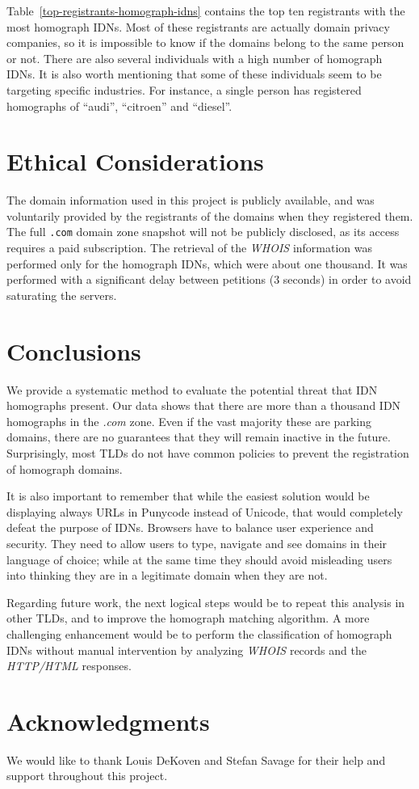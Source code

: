 \documentclass[letterpaper,twocolumn,10pt]{article}
\begin{document}
Table~\ref{top-registrants-homograph-idns} contains the top ten registrants with the most homograph IDNs.
Most of these registrants are actually domain privacy companies, so it is impossible to know if the domains belong to the same person or not.
There are also several individuals with a high number of homograph IDNs.
It is also worth mentioning that some of these individuals seem to be targeting specific industries.
For instance, a single person has registered homographs of ``audi'', ``citroen'' and ``diesel''.

\section{Ethical Considerations}
The domain information used in this project is publicly available, and was voluntarily provided by the registrants of the domains when they registered them.
The full \texttt{.com} domain zone snapshot will not be publicly disclosed, as its access requires a paid subscription.
The retrieval of the \textit{WHOIS} information was performed only for the homograph IDNs, which were about one thousand.
It was performed with a significant delay between petitions (3 seconds) in order to avoid saturating the servers.

\section{Conclusions}
We provide a systematic method to evaluate the potential threat that IDN homographs present.
Our data shows that there are more than a thousand IDN homographs in the \textit{.com} zone.
Even if the vast majority these are parking domains, there are no guarantees that they will remain inactive in the future.
Surprisingly, most TLDs do not have common policies to prevent the registration of homograph domains.

It is also important to remember that while the easiest solution would be displaying always URLs in Punycode instead of Unicode, that would completely defeat the purpose of IDNs.
Browsers have to balance user experience and security.
They need to allow users to type, navigate and see domains in their language of choice; while at the same time they should avoid misleading users into thinking they are in a legitimate domain when they are not.

Regarding future work, the next logical steps would be to repeat this analysis in other TLDs, and to improve the homograph matching algorithm.
A more challenging enhancement would be to perform the classification of homograph IDNs without manual intervention by analyzing \textit{WHOIS} records and the \textit{HTTP/HTML} responses.

\section*{Acknowledgments}
We would like to thank Louis DeKoven and Stefan Savage for their help and support throughout this project.

{\footnotesize 
}

\theendnotes
\end{document}
